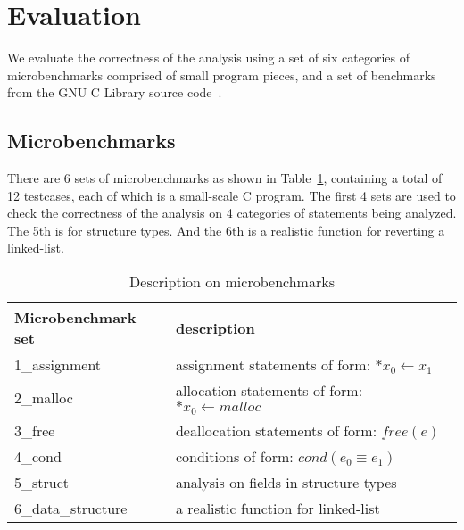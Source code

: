 \section{Evaluation}
\label{s:evaluation}

We evaluate the correctness of the analysis using a set of six categories of 
microbenchmarks comprised of small program pieces, and a set of benchmarks 
from the GNU C Library source code~\cite{glibc}.

\subsection{Microbenchmarks}
\label{microbenchmark}

There are 6 sets of microbenchmarks as shown in Table~\ref{tbl:micro}, 
containing a total of 12 testcases, each of which is a small-scale C program.
The first 4 sets are used to check the correctness of the analysis on 4 
categories of statements being analyzed. The 5th is for  
structure types. And the 6th is a realistic function for reverting a linked-list.



\begin{table}[t!]
  \centering
    \begin{tabular}{|l|l|}
    \hline
    Microbenchmark set & description\\
    \hline
    \hline
    1\_assignment & assignment statements of form: $*x_0\gets x_1$ \\
    \hline
    2\_malloc & allocation statements of form: $*x_0\gets malloc$ \\
    \hline
    3\_free & deallocation statements of form: $free(e)$ \\
    \hline
    4\_cond & conditions of form: $cond(e_0\equiv e_1)$ \\
    \hline
    5\_struct & analysis on fields in structure types \\
    \hline
    6\_data\_structure & a realistic function for linked-list \\
    \hline
    \end{tabular}
    \caption{\label{tbl:micro} Description on microbenchmarks}
\end{table}

